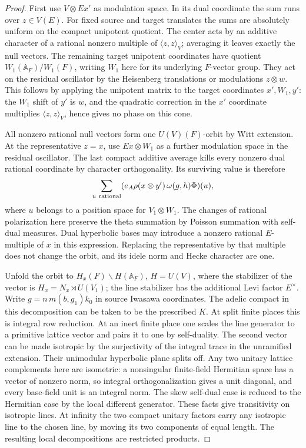 \begin{proof}
First use \(V\otimes Ex'\) as modulation space. In its dual
coordinate the sum runs over \(z\in V(E)\). For fixed source and
target translates the sums are absolutely uniform on the compact
unipotent quotient. The center acts by an additive character of a
rational nonzero multiple of \(\langle z,z\rangle_V\); averaging
it leaves exactly the null vectors. The remaining target unipotent
coordinates have quotient \(W_1(\mathbb A_F)/W_1(F)\), writing
\(W_1\) here for its underlying \(F\)-vector group. They act on
the residual oscillator by the Heisenberg translations or
modulations \(z\otimes w\). This follows by applying the unipotent
matrix to the target coordinates \(x',W_1,y'\): the \(W_1\) shift
of \(y'\) is \(w\), and the quadratic correction in the \(x'\)
coordinate multiplies \(\langle z,z\rangle_V\), hence gives no
phase on this cone.

All nonzero rational null vectors form one \(U(V)(F)\)-orbit by
Witt extension. At the representative \(z=x\), use \(Ex\otimes W_1\)
as a further modulation space in the residual oscillator.
The last compact additive average kills every nonzero dual rational
coordinate by character orthogonality. Its surviving value is
therefore
\[
    \sum_{u\ {\rm rational}}
      (e_A\rho(x\otimes y')\,\omega(g,h)\Phi)(u),
\]
where \(u\) belongs to a position space for \(V_1\otimes W_1\).
The changes of rational polarization here preserve the theta
summation by Poisson summation with self-dual measures. Dual hyperbolic
bases may introduce a nonzero rational \(E\)-multiple of \(x\)
in this expression. Replacing the representative by that multiple
does not change the orbit, and its idele norm and Hecke character
are one.

Unfold the orbit to \(H_x(F)\backslash H(\mathbb A_F)\),
\(H=U(V)\), where the stabilizer of the vector is
\(H_x=N_x\rtimes U(V_1)\); the line stabilizer has the additional
Levi factor \(E^\times\). Write \(g=n\,m(b,g_1)k_0\) in source
Iwasawa coordinates. The adelic compact in this decomposition can
be taken to be the prescribed \(K\). At split finite places this
is integral row reduction. At an inert finite place one scales the
line generator to a primitive lattice vector and pairs it to one
by self-duality. The second vector can be made isotropic by the
surjectivity of the integral trace in the unramified extension.
Their unimodular hyperbolic plane splits off. Any two unitary
lattice complements here are isometric: a nonsingular finite-field
Hermitian space has a vector of nonzero norm, so integral
orthogonalization gives a unit diagonal, and every base-field unit
is an integral norm. The skew self-dual case is reduced to the
Hermitian case by the local different generator. These facts give
transitivity on isotropic lines. At infinity the two compact unitary
factors carry any isotropic line to the chosen line, by moving its
two components of equal length. The resulting local decompositions
are restricted products.


\end{proof}
